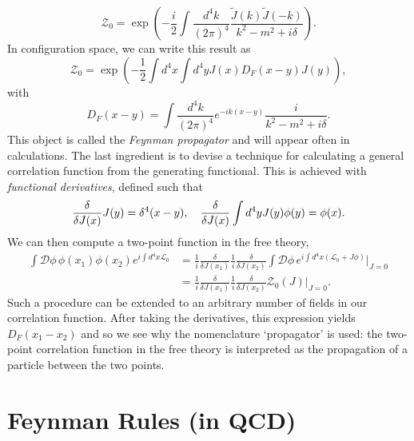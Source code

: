 \begin{equation}
\mathcal{Z}_0 = \exp \left( -\frac{i}{2} \int \frac{d^4 k}{(2 \pi)^4} \frac{\tilde{J}(k) \tilde{J}(-k)}{k^2 - m^2 + i \delta} \right).
\end{equation}
In configuration space, we can write this result as
\begin{equation}
\mathcal{Z}_0 = \exp \left( -\frac{1}{2} \int d^4 x \int d^4 y  J(x) D_F(x - y) J(y) \right),
\end{equation}
with
\begin{equation}
D_F(x - y) = \int \frac{d^4 k}{(2 \pi)^4} e^{-i k (x - y)} \frac{i}{k^2 - m^2 + i \delta}.
\end{equation}
This object is called the \emph{Feynman propagator} and will appear often in calculations. The last ingredient is to devise a technique for calculating a general correlation function from the generating functional. This is achieved with \emph{functional derivatives}, defined such that
\begin{equation}
\frac{\delta}{\delta J(x)}J(y) = \delta^4(x - y), \hspace{10 pt} \frac{\delta}{\delta J(x)} \int d^4 y J(y) \phi(y) = \phi(x).
\end{equation}
We can then compute a two-point function in the free theory,
\begin{equation}
\begin{split}
\int \mathcal{D} \phi \hspace{2pt} \phi(x_1) \phi(x_2) e^{i \int d^4 x \mathscr{L}_0}& = \frac{1}{i} \frac{\delta}{\delta J(x_1)}\frac{1}{i} \frac{\delta}{\delta J(x_2)} \int \mathcal{D} \phi \hspace{2pt} e^{i \int d^4x(\mathscr{L}_0 + J \phi)}\biggr\rvert_{J = 0} \\
&=  \frac{1}{i} \frac{\delta}{\delta J(x_1)}\frac{1}{i} \frac{\delta}{\delta J(x_2)} \mathcal{Z}_0(J)\biggr\rvert_{J = 0}.
\end{split}
\end{equation}
Such a procedure can be extended to an arbitrary number of fields in our correlation function. After taking the derivatives, this expression yields $D_F(x_1 - x_2)$ and so we see why the nomenclature `propagator' is used: the two-point correlation function in the free theory is interpreted as the propagation of a particle between the two points.

\section{Feynman Rules (in QCD)}

